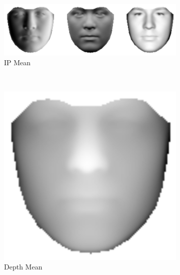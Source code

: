 \begin{figure}[t]
    \centering
    \begin{subfigure}[b]{0.5\textwidth}
    	\includegraphics[width=\textwidth]{statistical_normals/images/lk2d/normals_aam_mean.png}
    	\caption{IP Mean}\label{subfig:singl_img_ip_aam_mean}
    \end{subfigure}
    \\
    \hspace*{\fill}
    \begin{subfigure}[b]{0.3\textwidth}
    	\includegraphics[width=\textwidth]{statistical_normals/images/lk2d/depth_aam_mean.png}
    	\caption{Depth Mean}\label{subfig:singl_img_depth_aam_mean}
    \end{subfigure} \hfill
    \begin{subfigure}[b]{0.3\textwidth}

\end{subfigure}
\end{figure}
